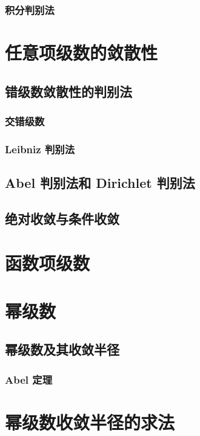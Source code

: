\documentclass[lang = zh , final , oneside , openany , titlepage , zihao = -4 , linespread = 1.3 , baselineskip = false , cjk-font = windows , text-font = newtx , math-font = newtx]{sjtureport}
\begin{document}
\subsubsection{积分判别法}

\section{任意项级数的敛散性}

\subsection{错级数敛散性的判别法}

\subsubsection{交错级数}

\subsubsection{Leibniz 判别法}

\subsection{Abel 判别法和 Dirichlet 判别法}

\subsection{绝对收敛与条件收敛}

\section{函数项级数}

\section{幂级数}

\subsection{幂级数及其收敛半径}

\subsubsection{Abel 定理}

\section{幂级数收敛半径的求法}
\end{document}
